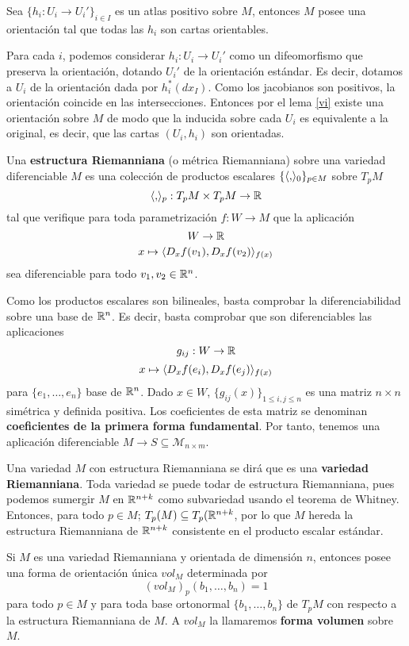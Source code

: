 \documentclass[CV.tex]{subfiles}
\begin{document}
\begin{prop}
Sea $\{h_i:U_i\to U_i'\}_{i\in I}$ es un atlas positivo sobre $M$, entonces $M$ posee una orientación tal que todas las $h_i$ son cartas orientables.
\end{prop}
\begin{dem}
Para cada $i$, podemos considerar $h_i:U_i\to U_i'$ como un difeomorfismo que preserva la orientación, dotando $U_i'$ de la orientación estándar. Es decir, dotamos a $U_i$ de la orientación dada por $h_i^*(dx_I)$. Como los jacobianos son positivos, la orientación coincide en las intersecciones. Entonces por el lema \ref{vi} existe una orientación sobre $M$ de modo que la inducida sobre cada $U_i$ es equivalente a la original, es decir, que las cartas $(U_i,h_i)$ son orientadas.
\QED
\end{dem}


\begin{defi}
Una \textbf{estructura Riemanniana} (o métrica Riemanniana) sobre una variedad diferenciable $M$ es una colección de productos escalares $\{\langle{,}\rangle_0\}_{p\in M}$ sobre $T_pM$
\[
\langle{,}\rangle_p:T_pM\times T_pM\to\mathbb{R}
\] 
tal que verifique para toda parametrización $f:W\to M$ que la aplicación
\[
W\to\mathbb{R}
\]
\[
x\mapsto \langle{D_xf(v_1),D_xf(v_2)}\rangle_{f(x)}
\]
sea diferenciable para todo $v_1,v_2\in\mathbb{R}^n$.
\end{defi}

Como los productos escalares son bilineales, basta comprobar la diferenciabilidad sobre una base de $\mathbb{R}^n$.  Es decir, basta comprobar que son diferenciables las aplicaciones
\[
g_{ij}:W\to \mathbb{R}
\]
\[
x\mapsto \langle{D_x f(e_i),D_xf(e_j)}\rangle_{f(x)}
\]
para $\{e_1,\dots, e_n\}$ base de $\mathbb{R}^n$. Dado $x\in W$, $\{g_{ij}(x)\}_{1\leq i,j\leq n}$ es una matriz $n\times n$ simétrica y definida positiva. Los coeficientes de esta matriz se denominan \textbf{coeficientes de la primera forma fundamental}. Por tanto, tenemos una aplicación diferenciable $M\to S\subseteq \mathcal{M}_{n\times m}$.  

Una variedad $M$ con estructura Riemanniana se dirá que es una \textbf{variedad Riemanniana}. Toda variedad se puede todar de estructura Riemanniana, pues podemos sumergir $M$ en $\mathbb{R}^{n+k}$ como subvariedad usando el teorema de Whitney. Entonces, para todo $p\in M$; $T_p(M)\subseteq T_p(\mathbb{R}^{n+k}$, por lo que $M$ hereda la estructura Riemanniana de $\mathbb{R}^{n+k}$ consistente en el producto escalar estándar.


\begin{prop}
Si $M$ es una variedad Riemanniana y orientada de dimensión $n$, entonces posee una forma de orientación única $vol_M$ determinada por
\[
(vol_M)_p(b_1,\dots, b_n)=1
\]
para todo $p\in M$ y para toda base ortonormal $\{b_1,\dots, b_n\}$ de $T_pM$ con respecto a la estructura Riemanniana de $M$. A $vol_M$ la llamaremos \textbf{forma volumen} sobre $M$.
\end{prop}

\begin{dem}
\QED
\end{dem}
\end{document}
